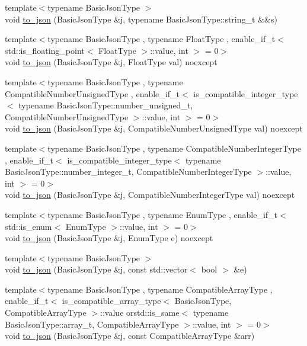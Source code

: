 \begin{DoxyCompactItemize}
{\footnotesize template$<$typename Basic\+Json\+Type $>$ }\\void \hyperlink{namespacenlohmann_1_1detail_a4aa1ca6b7c61bf19d1f30ea5b669f68e}{to\+\_\+json} (Basic\+Json\+Type \&j, typename Basic\+Json\+Type\+::string\+\_\+t \&\&s)
\item 
{\footnotesize template$<$typename Basic\+Json\+Type , typename Float\+Type , enable\+\_\+if\+\_\+t$<$ std\+::is\+\_\+floating\+\_\+point$<$ Float\+Type $>$\+::value, int $>$  = 0$>$ }\\void \hyperlink{namespacenlohmann_1_1detail_a22bffdc8bc7e43af380ba2050696b230}{to\+\_\+json} (Basic\+Json\+Type \&j, Float\+Type val) noexcept
\item 
{\footnotesize template$<$typename Basic\+Json\+Type , typename Compatible\+Number\+Unsigned\+Type , enable\+\_\+if\+\_\+t$<$ is\+\_\+compatible\+\_\+integer\+\_\+type$<$ typename Basic\+Json\+Type\+::number\+\_\+unsigned\+\_\+t, Compatible\+Number\+Unsigned\+Type $>$\+::value, int $>$  = 0$>$ }\\void \hyperlink{namespacenlohmann_1_1detail_ae5fd66b5517b3b5a6c6b9fd9f29ba8dc}{to\+\_\+json} (Basic\+Json\+Type \&j, Compatible\+Number\+Unsigned\+Type val) noexcept
\item 
{\footnotesize template$<$typename Basic\+Json\+Type , typename Compatible\+Number\+Integer\+Type , enable\+\_\+if\+\_\+t$<$ is\+\_\+compatible\+\_\+integer\+\_\+type$<$ typename Basic\+Json\+Type\+::number\+\_\+integer\+\_\+t, Compatible\+Number\+Integer\+Type $>$\+::value, int $>$  = 0$>$ }\\void \hyperlink{namespacenlohmann_1_1detail_a91fe576be579c8c2fdd14610605c6dd2}{to\+\_\+json} (Basic\+Json\+Type \&j, Compatible\+Number\+Integer\+Type val) noexcept
\item 
{\footnotesize template$<$typename Basic\+Json\+Type , typename Enum\+Type , enable\+\_\+if\+\_\+t$<$ std\+::is\+\_\+enum$<$ Enum\+Type $>$\+::value, int $>$  = 0$>$ }\\void \hyperlink{namespacenlohmann_1_1detail_a0c8b159dba71981d6c555d284cf6e2bf}{to\+\_\+json} (Basic\+Json\+Type \&j, Enum\+Type e) noexcept
\item 
{\footnotesize template$<$typename Basic\+Json\+Type $>$ }\\void \hyperlink{namespacenlohmann_1_1detail_aeca6fb5fede5ed1e12a4420d98a5692b}{to\+\_\+json} (Basic\+Json\+Type \&j, const std\+::vector$<$ bool $>$ \&e)
\item 
{\footnotesize template$<$typename Basic\+Json\+Type , typename Compatible\+Array\+Type , enable\+\_\+if\+\_\+t$<$ is\+\_\+compatible\+\_\+array\+\_\+type$<$ Basic\+Json\+Type, Compatible\+Array\+Type $>$\+::value orstd\+::is\+\_\+same$<$ typename Basic\+Json\+Type\+::array\+\_\+t, Compatible\+Array\+Type $>$\+::value, int $>$  = 0$>$ }\\void \hyperlink{namespacenlohmann_1_1detail_a3afebc132c5ff83f9cd160e52030fdfd}{to\+\_\+json} (Basic\+Json\+Type \&j, const Compatible\+Array\+Type \&arr)

\end{DoxyCompactItemize}
